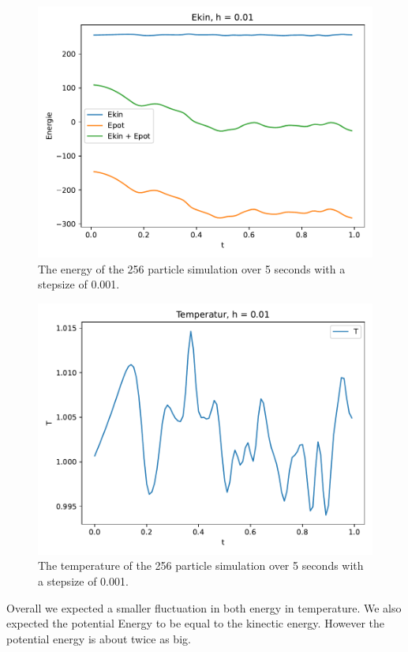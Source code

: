 \begin{itemize}
\begin{figure}
            \includegraphics[width=\textwidth]{images/plot_E_256.pdf}
            \caption{The energy of the 256 particle simulation over 5 seconds with a stepsize of 0.001.}
        \end{figure}
        \begin{figure}
            \includegraphics[width=\textwidth]{images/plot_T_256.pdf}
            \caption{The temperature of the 256 particle simulation over 5 seconds with a stepsize of 0.001.}
        \end{figure}
        \FloatBarrier
        Overall we expected a smaller fluctuation in both energy in temperature.
        We also expected the potential Energy to be equal to the kinectic energy.
        However the potential energy is about twice as big.

\end{itemize}
